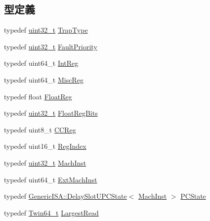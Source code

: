\subsection*{型定義}
\begin{DoxyCompactItemize}
\item 
typedef \hyperlink{Type_8hh_a435d1572bf3f880d55459d9805097f62}{uint32\_\-t} \hyperlink{namespaceSparcISA_aabeb6cc11127ef5b6ebc776bfc5fb95b}{TrapType}
\item 
typedef \hyperlink{Type_8hh_a435d1572bf3f880d55459d9805097f62}{uint32\_\-t} \hyperlink{namespaceSparcISA_ab4ef46911de05ddf45ea58ee440ff324}{FaultPriority}
\item 
typedef uint64\_\-t \hyperlink{namespaceSparcISA_a0e080577527fb3e9685399f75b5caf15}{IntReg}
\item 
typedef uint64\_\-t \hyperlink{namespaceSparcISA_aa16539aa6584fd12f7d6fa868f75b4de}{MiscReg}
\item 
typedef float \hyperlink{namespaceSparcISA_a449d6bb660f5ca613cf359f05d81a20f}{FloatReg}
\item 
typedef \hyperlink{Type_8hh_a435d1572bf3f880d55459d9805097f62}{uint32\_\-t} \hyperlink{namespaceSparcISA_acc2693113a7cf1a4ff1c9d63b7de6451}{FloatRegBits}
\item 
typedef uint8\_\-t \hyperlink{namespaceSparcISA_a5834599c0196ce4accda8049e7320621}{CCReg}
\item 
typedef uint16\_\-t \hyperlink{namespaceSparcISA_a69329e1d929a534ff51be6cf8216b69a}{RegIndex}
\item 
typedef \hyperlink{Type_8hh_a435d1572bf3f880d55459d9805097f62}{uint32\_\-t} \hyperlink{namespaceSparcISA_a301c22ea09fa33dcfe6ddf22f203699c}{MachInst}
\item 
typedef uint64\_\-t \hyperlink{namespaceSparcISA_aec686c38e40c7f794f1435591c15c275}{ExtMachInst}
\item 
typedef \hyperlink{classGenericISA_1_1DelaySlotUPCState}{GenericISA::DelaySlotUPCState}$<$ \hyperlink{namespaceSparcISA_a301c22ea09fa33dcfe6ddf22f203699c}{MachInst} $>$ \hyperlink{namespaceSparcISA_ad2dd2c09ea20fdef260773e5cb128f93}{PCState}
\item 
typedef \hyperlink{structm5__twin64__t}{Twin64\_\-t} \hyperlink{namespaceSparcISA_aca26dbbb6d5074318b8557e012e98a34}{LargestRead}
\end{DoxyCompactItemize}
